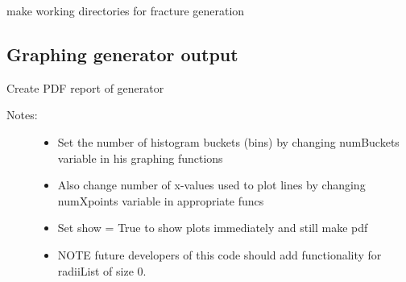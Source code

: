 \documentclass[letterpaper,10pt,english]{sphinxmanual}
\begin{document}

\begin{fulllineitems}
\label{\detokenize{pydfnworks:pydfnworks.generator.make_working_directory}}
make working directories for fracture generation

\end{fulllineitems}



\subsection{Graphing generator output}
\label{\detokenize{pydfnworks:module-pydfnworks.gen_output}}\label{\detokenize{pydfnworks:graphing-generator-output}}

\begin{fulllineitems}
\label{\detokenize{pydfnworks:pydfnworks.gen_output.output_report}}
Create PDF report of generator
\begin{description}
\item[{Notes:}] \leavevmode\begin{itemize}
\item {} 
Set the number of histogram buckets (bins) by changing numBuckets variable in his graphing functions

\item {} 
Also change number of x-values used to plot lines by changing numXpoints variable in appropriate funcs

\item {} 
Set show = True to show plots immediately and still make pdf

\item {} 
NOTE future developers of this code should add functionality for radiiList of size 0.

\end{itemize}

\end{description}

\end{fulllineitems}
\end{document}
